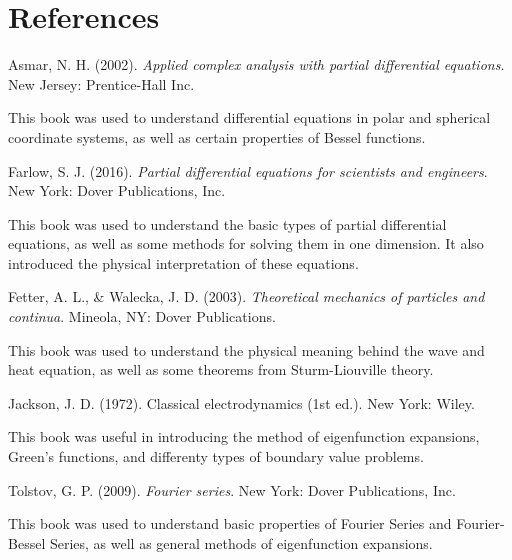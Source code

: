 \documentclass{article}
\begin{document}
\section{References}
Asmar, N. H. (2002). \textit{Applied complex analysis with partial differential equations}. New Jersey: Prentice-Hall Inc.\\
\begin{adjustwidth}{2 cm}{}
This book was used to understand differential equations in polar and spherical coordinate systems, as well as certain properties of Bessel functions.\\
\end{adjustwidth}
Farlow, S. J. (2016). \textit{Partial differential equations for scientists and engineers}. New York: Dover Publications, Inc.\\
\begin{adjustwidth}{2 cm}{}
This book was used to understand the basic types of partial differential equations, as well as some methods for solving them in one dimension. It also introduced the physical interpretation of these equations.\\
\end{adjustwidth}
Fetter, A. L., \& Walecka, J. D. (2003). \textit{Theoretical mechanics of particles and continua}. Mineola, NY: Dover Publications. \\
\begin{adjustwidth}{2 cm}{}
This book was used to understand the physical meaning behind the wave and heat equation, as well as some theorems from Sturm-Liouville theory.\\
\end{adjustwidth}
Jackson, J. D. (1972). Classical electrodynamics (1st ed.). New York: Wiley.\\
\begin{adjustwidth}{2 cm}{}
This book was useful in introducing the method of eigenfunction expansions, Green's functions, and differenty types of boundary value problems.
\end{adjustwidth}
Tolstov, G. P. (2009). \textit{Fourier series}. New York: Dover Publications, Inc.\\
\begin{adjustwidth}{2 cm}{}
This book was used to understand basic properties of Fourier Series and Fourier-Bessel Series, as well as general methods of eigenfunction expansions.
\end{adjustwidth}
\end{document}
